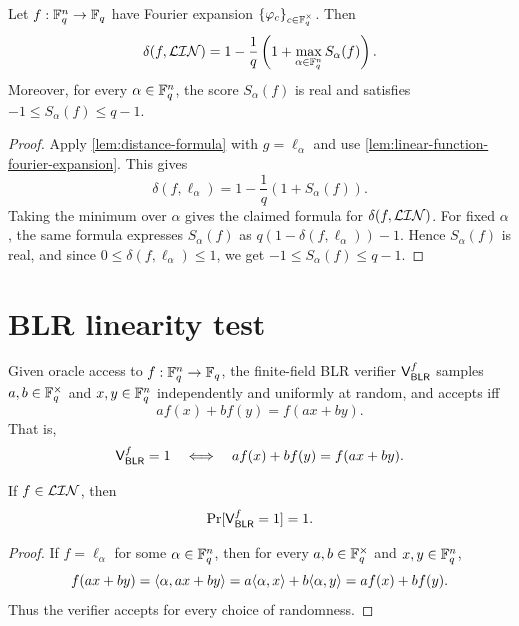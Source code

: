 \begin{lemma}
\label{lem:distance-to-linearity-fourier}
\leanok
Let $f:{\mathbb F}_q^n\to{\mathbb F}_q$ have Fourier expansion
$\{{\varphi}_{c}\}_{c\in{\mathbb F}_q^\times}$. Then
\[
    \delta(f,\mathcal{LIN})
    = 1-\frac{1}{q}\left(1+
        \max_{\alpha\in{\mathbb F}_q^n}
        S_\alpha(f)
    \right).
\]
Moreover, for every $\alpha\in{\mathbb F}_q^n$, the score $S_\alpha(f)$ is real and
satisfies $-1\le S_\alpha(f)\le q-1$.
\end{lemma}

\begin{proof}\leanok
Apply \cref{lem:distance-formula} with $g=\ell_\alpha$ and use
\cref{lem:linear-function-fourier-expansion}. This gives
\[
    \delta(f,\ell_\alpha)
    =1-\frac{1}{q}\left(1+
        S_\alpha(f)
    \right).
\]
Taking the minimum over $\alpha$ gives the claimed formula for
$\delta(f,\mathcal{LIN})$.
For fixed $\alpha$, the same formula expresses $S_\alpha(f)$ as
$q(1-\delta(f,\ell_\alpha))-1$. Hence $S_\alpha(f)$ is real, and since
$0\le \delta(f,\ell_\alpha)\le 1$, we get $-1\le S_\alpha(f)\le q-1$.
\end{proof}

\section{BLR linearity test}

\begin{definition}
\label{def:finite-field-blr-test}
\leanok
Given oracle access to $f:{\mathbb F}_q^n\to{\mathbb F}_q$, the finite-field BLR verifier
$\mathsf{V}_{\mathsf{BLR}}^f$ samples $a,b\in{\mathbb F}_q^\times$ and $x,y\in{\mathbb F}_q^n$ independently and uniformly at random, and accepts iff
\[
    a f(x)+b f(y)=f(ax+by).
\]
That is,
\[
    \mathsf{V}_{\mathsf{BLR}}^f=1
    \quad\Longleftrightarrow\quad
    a f(x)+b f(y)=f(ax+by).
\]
\end{definition}

\begin{lemma}[Completeness]
\label{lem:blr-completeness}
\leanok
If $f\in\mathcal{LIN}$, then
\[
    \Pr[\mathsf{V}_{\mathsf{BLR}}^f=1]=1.
\]
\end{lemma}

\begin{proof}\leanok
If $f=\ell_\alpha$ for some $\alpha\in{\mathbb F}_q^n$, then for every
$a,b\in{\mathbb F}_q^\times$ and $x,y\in{\mathbb F}_q^n$,
\[
    f(ax+by)
    =\langle \alpha, ax+by \rangle
    =a\langle \alpha, x \rangle+b\langle \alpha, y \rangle
    =a f(x)+b f(y).
\]
Thus the verifier accepts for every choice of randomness.
\end{proof}

